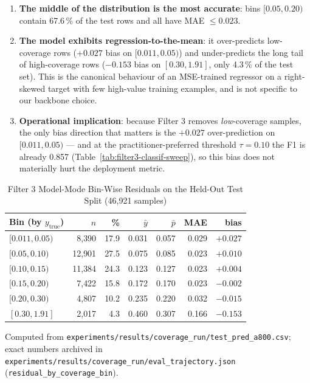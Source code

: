 \documentclass[acmlarge,nonacm,screen]{acmart}
\begin{document}
\begin{enumerate}
    \item \textbf{The middle of the distribution is the most accurate}:
        bins $[0.05, 0.20)$ contain 67.6\,\% of the test rows and
        all have MAE $\leq 0.023$.
    \item \textbf{The model exhibits regression-to-the-mean}: it
        over-predicts low-coverage rows ($+0.027$ bias on
        $[0.011, 0.05)$) and under-predicts the long
        tail of high-coverage rows ($-0.153$ bias on
        $[0.30, 1.91]$, only 4.3\,\% of the test set). This is the
        canonical behaviour of an MSE-trained regressor on a
        right-skewed target with few high-value training examples,
        and is not specific to our backbone choice.
    \item \textbf{Operational implication}: because Filter 3 removes
        \emph{low}-coverage samples, the only bias direction that
        matters is the $+0.027$ over-prediction on
        $[0.011, 0.05)$ --- and at the practitioner-preferred
        threshold $\tau = 0.10$ the F1 is already 0.857
        (Table~\ref{tab:filter3-classif-sweep}), so this bias does
        not materially hurt the deployment metric.
\end{enumerate}

\begin{table}[htbp]
\caption{Filter 3 Model-Mode Bin-Wise Residuals on the Held-Out Test Split (46{,}921 samples)}
\label{tab:filter3-bin}
\begin{tabular}{@{}lrrrrrr@{}}
\toprule
\textbf{Bin (by $y_{\text{true}}$)} & \textbf{$n$} & \textbf{\%} & \textbf{$\bar{y}$} & \textbf{$\bar{p}$} & \textbf{MAE} & \textbf{bias} \\
\midrule
$[0.011, 0.05)$ &  8{,}390 & 17.9 & 0.031 & 0.057 & 0.029 & $+0.027$ \\
$[0.05,  0.10)$ & 12{,}901 & 27.5 & 0.075 & 0.085 & 0.023 & $+0.010$ \\
$[0.10,  0.15)$ & 11{,}384 & 24.3 & 0.123 & 0.127 & 0.023 & $+0.004$ \\
$[0.15,  0.20)$ &  7{,}422 & 15.8 & 0.172 & 0.170 & 0.023 & $-0.002$ \\
$[0.20,  0.30)$ &  4{,}807 & 10.2 & 0.235 & 0.220 & 0.032 & $-0.015$ \\
$[0.30,  1.91]$ &  2{,}017 &  4.3 & 0.460 & 0.307 & 0.166 & $-0.153$ \\
\bottomrule
\end{tabular}
\begin{flushleft}
\small Computed from
\texttt{experiments/\allowbreak results/\allowbreak coverage\_run/\allowbreak test\_pred\_a800.csv};
exact numbers archived in
\texttt{experiments/\allowbreak results/\allowbreak coverage\_run/\allowbreak eval\_trajectory.json}
(\texttt{residual\_by\_coverage\_bin}).
\end{flushleft}
\end{table}
\end{document}
